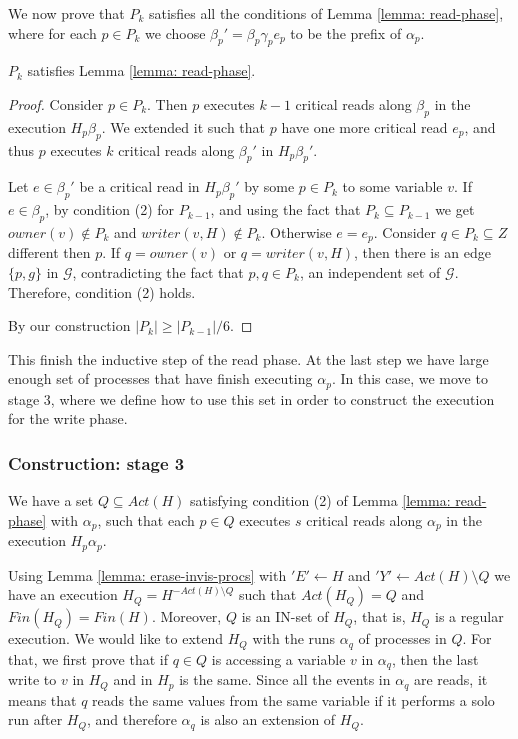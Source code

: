 We now prove that $P_k$ satisfies all the conditions of Lemma \ref{lemma: read-phase}, where for each $p \in P_k$ we choose $\beta_p' = \beta_p \gamma_p e_p$ to be the prefix of $\alpha_p$.

\begin{claim-subsection}
	$P_k$ satisfies Lemma \ref{lemma: read-phase}.
\end{claim-subsection}

\begin{proof}
	Consider $p \in P_k$. Then $p$ executes $k-1$ critical reads along $\beta_p$ in the execution $H_p \beta_p$. We extended it such that $p$ have one more critical read $e_p$, and thus $p$ executes $k$ critical reads along $\beta_p'$ in $H_p \beta_p'$.
	
	Let $e \in \beta_p'$ be a critical read in $H_p \beta_p'$ by some $p \in P_k$ to some variable $v$. If $e \in \beta_p$, by condition (2) for $P_{k-1}$, and using the fact that $P_k \subseteq P_{k-1}$ we get $owner(v) \notin P_k$ and $writer(v,H) \notin P_k$. Otherwise $e = e_p$. Consider $q \in P_k \subseteq Z$ different then $p$. If $q = owner(v)$ or $q = writer(v,H)$, then there is an edge $\{p,g\}$ in $\mathcal{G}$, contradicting the fact that $p,q \in P_k$, an independent set of $\mathcal{G}$. Therefore, condition (2) holds.
	
	By our construction $|P_k| \geq |P_{k-1}|/6$.
	
\end{proof}

This finish the inductive step of the read phase. At the last step we have large enough set of processes that have finish executing $\alpha_p$. In this case, we move to stage 3, where we define how to use this set in order to construct the execution for the write phase.



\subsubsection{Construction: stage 3}

We have a set $Q \subseteq Act(H)$ satisfying condition (2) of Lemma \ref{lemma: read-phase} with $\alpha_p$, such that each $p \in Q$ executes $s$ critical reads along $\alpha_p$ in the execution $H_p \alpha_p$.

Using Lemma \ref{lemma: erase-invis-procs} with $'E' \leftarrow H$ and $'Y' \leftarrow Act(H) \setminus Q$ we have an execution $H_Q = H^{-Act(H) \setminus Q}$ such that $Act(H_Q) = Q$ and $Fin(H_Q) = Fin(H)$. Moreover, $Q$ is an IN-set of $H_Q$, that is, $H_Q$ is a regular execution.
We would like to extend $H_Q$ with the runs $\alpha_q$ of processes in $Q$. For that, we first prove that if $q \in Q$ is accessing a variable $v$ in $\alpha_q$, then the last write to $v$ in $H_Q$ and in $H_p$ is the same. Since all the events in $\alpha_q$ are reads, it means that $q$ reads the same values from the same variable if it performs a solo run after $H_Q$, and therefore $\alpha_q$ is also an extension of $H_Q$.

